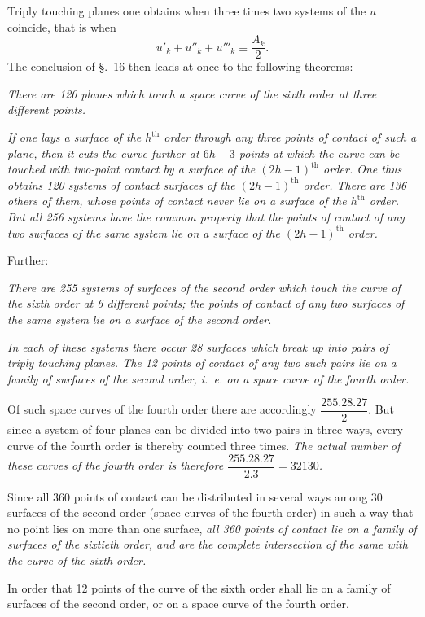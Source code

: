 \documentclass{article}
\begin{document}
Triply touching planes one obtains when three times two systems of the $u$ coincide, that is when
\[
u'_{k}+u''_{k}+u'''_{k} \equiv \frac{A_{k}}{2}.
\]
The conclusion of §.~16 then leads at once to the following theorems:

\emph{There are 120 planes which touch a space curve of the sixth order at three different points.}

\emph{If one lays a surface of the $h^{\text{th}}$ order through any three points of contact of such a plane, then it cuts the curve further at $6h-3$ points at which the curve can be touched with two-point contact by a surface of the $(2h-1)^{\text{th}}$ order. One thus obtains 120 systems of contact surfaces of the $(2h-1)^{\text{th}}$ order. There are 136 others of them, whose points of contact never lie on a surface of the $h^{\text{th}}$ order. But all 256 systems have the common property that the points of contact of any two surfaces of the same system lie on a surface of the $(2h-1)^{\text{th}}$ order.}

Further:

\emph{There are 255 systems of surfaces of the second order which touch the curve of the sixth order at 6 different points; the points of contact of any two surfaces of the same system lie on a surface of the second order.}

\emph{In each of these systems there occur 28 surfaces which break up into pairs of triply touching planes. The 12 points of contact of any two such pairs lie on a family of surfaces of the second order, i.\ e. on a space curve of the fourth order.}

Of such space curves of the fourth order there are accordingly $\dfrac{255.28.27}{2}$. But since a system of four planes can be divided into two pairs in three ways, every curve of the fourth order is thereby counted three times. \emph{The actual number of these curves of the fourth order is therefore $\dfrac{255.28.27}{2.3}=32130$.}

Since all 360 points of contact can be distributed in several ways among 30 surfaces of the second order (space curves of the fourth order) in such a way that no point lies on more than one surface, \emph{all 360 points of contact lie on a family of surfaces of the sixtieth order, and are the complete intersection of the same with the curve of the sixth order.}

In order that 12 points of the curve of the sixth order shall lie on a family of surfaces of the second order, or on a space curve of the fourth order,
\end{document}
